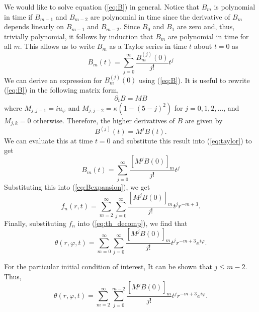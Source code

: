 \documentclass[12pt]{article}
\begin{document}
We would like to solve equation (\ref{eq:B}) in general. Notice that $B_{m}$ is polynomial in time if $B_{m-1}$ and $B_{m-2}$ are polynomial in time since the derivative of $B_{m}$ depends linearly on $B_{m-1}$ and $B_{m-2}$. Since $B_{0}$ and $B_{1}$ are zero and, thus, trivially polynomial, it follows by induction that $B_{m}$ are polynomial in time for all $m$. This allows us to write $B_{m}$ as a Taylor series in time $t$ about $t=0$ as
\begin{equation}
\label{eq:taylor}
B_{m}(t)=\sum_{j=0}^{\infty}\frac{B_{m}^{(j)}(0)}{j!}t^{j}
\end{equation}
We  can derive an expression for $B_{m}^{(j)}(0)$ using (\ref{eq:B}). It is useful to rewrite (\ref{eq:B}) in the following matrix form,
\begin{equation}
\partial_{t}B=MB
\end{equation}
where $M_{j,j-1}=iu_{\varphi}$ and $M_{j,j-2}=\kappa(1-(5-j)^2)$ for $j = 0,1, 2, \dots $, and $M_{j,k}=0$ otherwise. Therefore, the higher derivatives of $B$ are given by 
\begin{equation}
B^{(j)}(t)=M^{j}B(t).
\end{equation} 
We can evaluate this at time $t=0$ and substitute this result into (\ref{eq:taylor}) to get
\begin{equation}
\label{eq:taylor2}
B_{m}(t)=\sum_{j=0}^{\infty}\frac{[M^{j}B(0)]_{m}}{j!}t^{j}
\end{equation}
Substituting this into (\ref{eq:Bexpansion}), we get
\begin{equation}
f_{n}(r,t)=\sum_{m=2}^{\infty}\sum_{j=0}^{\infty}\frac{[M^{j}B(0)]_{m}}{j!}t^{j}r^{-m+3}.
\end{equation}
Finally, substituting $f_{n}$ into (\ref{eq:th_decomp}), we find that 
\begin{equation}
\theta(r,\varphi,t)=\sum_{m=0}^{\infty}\sum_{j=0}^{\infty}\frac{[M^{j}B(0)]_{m}}{j!}t^{j}r^{-m+3}e^{i\varphi}.
\end{equation}

For the particular initial condition of interest, It can be shown that 
$j \leq m-2$. Thus,
\begin{equation}
\theta(r,\varphi,t)=\sum_{m=2}^{\infty}\sum_{j=0}^{m-2}\frac{[M^{j}B(0)]_{m}}{j!}t^{j}r^{-m+3}e^{i\varphi}.
\end{equation}

\end{document}

